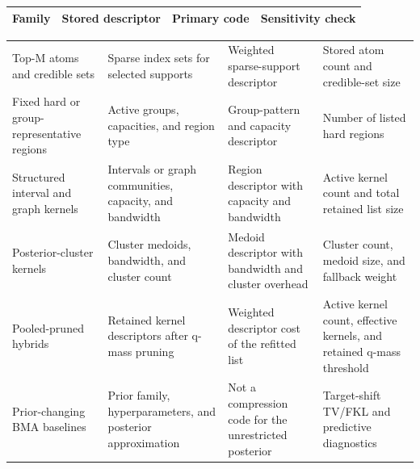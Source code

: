 \setlength{\tabcolsep}{2.6pt}
\renewcommand{\tabularxcolumn}[1]{m{#1}}
\renewcommand{\arraystretch}{1.0}
\begin{tabularx}{0.985\textwidth}{@{}>{\raggedright\arraybackslash}m{}>{\raggedright\arraybackslash}m{}>{\raggedright\arraybackslash}m{}>{\raggedright\arraybackslash}X@{}}
\toprule
Family & Stored descriptor & Primary code & Sensitivity check \\
\midrule
\end{tabularx}
\vspace{-0.25em}
\renewcommand{\arraystretch}{1.32}
\begin{tabularx}{0.985\textwidth}{@{}>{\raggedright\arraybackslash}m{}>{\raggedright\arraybackslash}m{}>{\raggedright\arraybackslash}m{}>{\raggedright\arraybackslash}X@{}}
\rule[-1.8ex]{0pt}{7.2ex}Top-M atoms and credible sets & Sparse index sets for selected supports & Weighted sparse-support descriptor & Stored atom count and credible-set size \\
\rule[-1.8ex]{0pt}{7.2ex}Fixed hard or group-representative regions & Active groups, capacities, and region type & Group-pattern and capacity descriptor & Number of listed hard regions \\
\rule[-1.8ex]{0pt}{7.2ex}Structured interval and graph kernels & Intervals or graph communities, capacity, and bandwidth & Region descriptor with capacity and bandwidth & Active kernel count and total retained list size \\
\rule[-1.8ex]{0pt}{7.2ex}Posterior-cluster kernels & Cluster medoids, bandwidth, and cluster count & Medoid descriptor with bandwidth and cluster overhead & Cluster count, medoid size, and fallback weight \\
\rule[-1.8ex]{0pt}{7.2ex}Pooled-pruned hybrids & Retained kernel descriptors after q-mass pruning & Weighted descriptor cost of the refitted list & Active kernel count, effective kernels, and retained q-mass threshold \\
\rule[-1.8ex]{0pt}{7.2ex}Prior-changing BMA baselines & Prior family, hyperparameters, and posterior approximation & Not a compression code for the unrestricted posterior & Target-shift TV/FKL and predictive diagnostics \\
\bottomrule
\end{tabularx}

